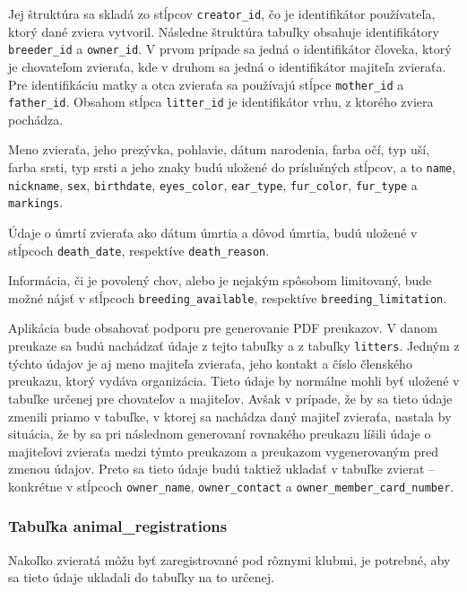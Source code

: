 Jej štruktúra sa skladá zo stĺpcov \texttt{creator_id}, čo je identifikátor používateľa, ktorý dané zviera vytvoril. Následne štruktúra tabuľky obsahuje identifikátory \texttt{breeder_id} a \texttt{owner_id}. V prvom prípade sa jedná o identifikátor človeka, ktorý je chovateľom zvieraťa, kde v druhom sa jedná o identifikátor majiteľa zvieraťa. Pre identifikáciu matky a otca zvieraťa sa používajú stĺpce \texttt{mother_id} a \texttt{father_id}. Obsahom stĺpca \texttt{litter_id} je identifikátor vrhu, z ktorého zviera pochádza.

Meno zvieraťa, jeho prezývka, pohlavie, dátum narodenia, farba očí, typ uší, farba srsti, typ srsti a jeho znaky budú uložené do príslušných stĺpcov, a to  \texttt{name}, \texttt{nickname}, \texttt{sex}, \texttt{birthdate}, \texttt{eyes_color}, \texttt{ear_type}, \texttt{fur_color}, \texttt{fur_type} a \texttt{markings}.

Údaje o úmrtí zvieraťa ako dátum úmrtia a dôvod úmrtia, budú uložené v stĺpcoch \texttt{death_date}, respektíve \texttt{death_reason}.

Informácia, či je povolený chov, alebo je nejakým spôsobom limitovaný, bude možné nájsť v stĺpcoch \texttt{breeding_available}, respektíve \texttt{breeding_limitation}.

Aplikácia bude obsahovať podporu pre generovanie PDF preukazov. V danom preukaze sa budú nachádzať údaje z tejto tabuľky a z tabuľky \texttt{litters}. Jedným z týchto údajov je aj meno majiteľa zvieraťa, jeho kontakt a číslo členského preukazu, ktorý vydáva organizácia. Tieto údaje by normálne mohli byť uložené v tabuľke určenej pre chovateľov a majiteľov. Avšak v prípade, že by sa tieto údaje zmenili priamo v tabuľke, v ktorej sa nachádza daný majiteľ zvieraťa, nastala by situácia, že by sa pri následnom generovaní rovnakého preukazu líšili údaje o majiteľovi zvieraťa medzi týmto preukazom a preukazom vygenerovaným pred zmenou údajov.
Preto sa tieto údaje budú taktiež ukladať v tabuľke zvierat -- konkrétne v stĺpcoch \texttt{owner_name}, \texttt{owner_contact} a \texttt{owner_member_card_number}.

\subsubsection{Tabuľka animal\_registrations}
Nakoľko zvieratá môžu byť zaregistrované pod rôznymi klubmi, je potrebné, aby sa tieto údaje ukladali do tabuľky na to určenej.


